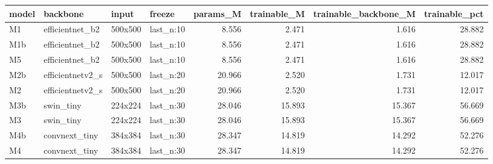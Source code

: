 \begin{tabular}{llllrrrr}
\toprule
model & backbone & input & freeze & params\_M & trainable\_M & trainable\_backbone\_M & trainable\_pct \\
\midrule
M1 & efficientnet\_b2 & 500x500 & last\_n:10 & 8.556 & 2.471 & 1.616 & 28.882 \\
M1b & efficientnet\_b2 & 500x500 & last\_n:10 & 8.556 & 2.471 & 1.616 & 28.882 \\
M5 & efficientnet\_b2 & 500x500 & last\_n:10 & 8.556 & 2.471 & 1.616 & 28.882 \\
M2b & efficientnetv2\_s & 500x500 & last\_n:20 & 20.966 & 2.520 & 1.731 & 12.017 \\
M2 & efficientnetv2\_s & 500x500 & last\_n:20 & 20.966 & 2.520 & 1.731 & 12.017 \\
M3b & swin\_tiny & 224x224 & last\_n:30 & 28.046 & 15.893 & 15.367 & 56.669 \\
M3 & swin\_tiny & 224x224 & last\_n:30 & 28.046 & 15.893 & 15.367 & 56.669 \\
M4b & convnext\_tiny & 384x384 & last\_n:30 & 28.347 & 14.819 & 14.292 & 52.276 \\
M4 & convnext\_tiny & 384x384 & last\_n:30 & 28.347 & 14.819 & 14.292 & 52.276 \\
\bottomrule
\end{tabular}
